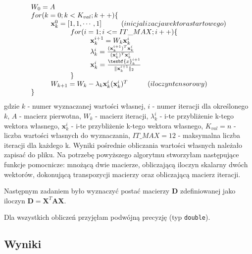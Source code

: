 \documentclass{article}
\newcommand\tab[1][1cm]{\hspace*{#1}}
\begin{document}
\begin{equation}
	\begin{array}{l}
	W_0 = A \\
	for(k=0; k< K_{val}; k++)\{ \\
	\tab \textbf{x}_k ^0 = [1, 1, \cdots , 1] \tab (inicjalizacja wektora startowego)\\
	\tab \tab for(i=1;i<=IT\_MAX; i++) \{ \\
	\tab \tab \tab \textbf{x}_k^{i+1} = W_k \textbf{x}_k ^i \\
	\tab \tab \tab \lambda _k ^i = \frac{(\textbf{x}_k ^{i+1})^T \textbf{x}_k ^i}{(\textbf{x}_k ^{i})^T \textbf{x}_k ^i} \\
	\tab \tab \tab \textbf{x}_k ^i = \frac{\texbf{x}_k ^{i+1}}{\| \textbf{x}_k^{i+1} \| _2} \\
	\tab \tab \} \\
	\tab W_{k+1} = W_k - \lambda_k \textbf{x}_k ^i (\textbf{x}_k ^i)^T     \tab  (iloczyn tensorowy) \\
	\}
	\end{array}
\end{equation}
gdzie $k$ - numer wyznaczanej wartości własnej, $i$ - numer iteracji dla określonego $k$, $A$ - macierz pierwotna, $W_k$ - macierz iteracji, $\lambda_k ^i$ - i-te przybliżenie k-tego wektora własnego, $\textbf{x}_k ^i$ - i-te przybliżenie k-tego wektora własnego, $K_{val} = n$ - liczba wartości własnych do wyznaczania, $IT\_MAX =12$ - maksymalna liczba iteracji dla każdego k. Wyniki pośrednie obliczania wartości własnych należało zapisać do pliku. Na potrzebę powyższego algorytmu stworzyłam następujące funkcje pomocnicze: mnożącą dwie macierze, obliczającą iloczyn skalarny dwóch wektorów, dokonującą transpozycji macierzy oraz obliczającą macierz iteracji. 
\par Następnym zadaniem było wyznaczyć postać macierzy \textbf{D} zdefiniowanej jako iloczyn $\textbf{D} = \textbf{X}^T \textbf{AX}$.
\par Dla wszystkich obliczeń przyjęłam podwójną precyzję (typ \texttt{double}).

\subsection{Wyniki}
\end{document}
